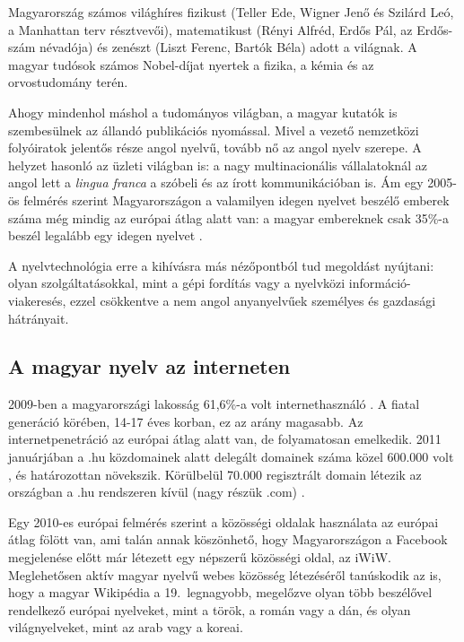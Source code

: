 \begin{multicols}{2}
Magyarország számos világhíres fizikust (Teller Ede, Wigner Jenő és Szilárd Leó, a Manhattan terv résztvevői), ma\-te\-ma\-ti\-kust (Rényi Alfréd, Erdős Pál, az Erdős-szám névadója) és zenészt (Liszt Ferenc, Bartók Béla) adott a világnak. A ma\-gyar tudósok számos Nobel-díjat nyertek a fizika, a kémia és az orvostudomány terén.

Ahogy mindenhol máshol a tudományos világban, a magyar kutatók is szembesülnek az állandó publikációs nyomással. Mivel a vezető nemzetközi folyóiratok jelentős része angol nyelvű, tovább nő az angol nyelv szerepe. A helyzet hasonló az üzleti világban is: a nagy multinacionális vállalatoknál az angol lett a \textit{lingua franca} a szóbeli és az írott kommunikációban is. Ám egy 2005-ös felmérés szerint  Ma\-gyar\-or\-szá\-gon a valamilyen idegen nyelvet beszélő emberek száma még mindig az európai átlag alatt van: a magyar embereknek csak 35\%-a beszél legalább egy idegen nyelvet \cite{tarki}. 

A nyelvtechnológia erre a kihívásra más nézőpontból tud megoldást nyújtani: olyan szolgáltatásokkal, mint a gépi fordítás vagy a nyelvközi információ-viakeresés, ezzel csökkentve a nem angol anya\-nyel\-vű\-ek személyes és gazdasági hátrányait. 

\subsection{A magyar nyelv az interneten}

2009-ben a magyarországi lakosság 61,6\%-a volt internethasználó \cite{internet}. A fiatal ge\-ne\-rá\-ció körében, 14-17 éves korban, ez az arány magasabb. Az internetpenetráció az európai átlag alatt van, de fo\-lya\-ma\-to\-san emelkedik. 2011 januárjában a .hu közdomainek alatt delegált domainek száma közel 600.000 volt \cite{domain}, és határozottan növekszik. Körülbelül 70.000 re\-giszt\-rált domain létezik az országban a .hu rendszeren kívül (nagy részük .com) \cite{com}.  


Egy 2010-es európai felmérés szerint a közösségi oldalak használata az európai átlag fölött van, ami talán annak köszönhető, hogy Magyarországon a Facebook megjelenése előtt már létezett egy népszerű közösségi oldal, az iWiW. Meglehetősen aktív magyar nyelvű webes közösség létezéséről tanúskodik az is, hogy a magyar Wikipédia a 19.\ leg\-na\-gyobb, megelőzve olyan több beszélővel rendelkező európai nyelveket, mint a török, a román vagy a dán, és olyan világnyelveket, mint az arab vagy a koreai. 


\end{multicols}
